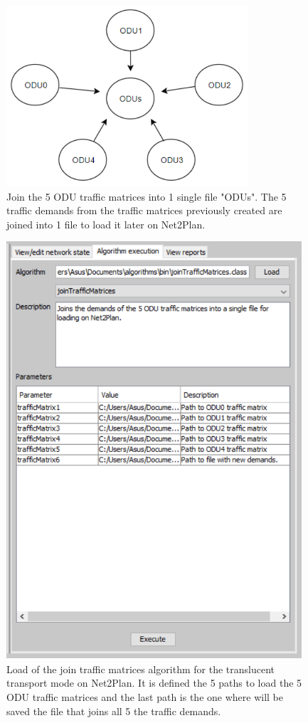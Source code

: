 \begin{figure}[H]
\centering
\includegraphics[width=9cm]{sdf/heuristic/translucent_survivability/figures/join_matrices_odus}
\caption{Join the 5 ODU traffic matrices into 1 single file "ODUs". The 5 traffic demands from the traffic matrices previously created are joined into 1 file to load it later on Net2Plan.}
\label{join_matrices_odus}
\end{figure}

\begin{figure}[H]
\centering
\includegraphics[width=11cm]{sdf/heuristic/translucent_survivability/figures/traffic_matrices}
\caption{Load of the join traffic matrices algorithm for the translucent transport mode on Net2Plan. It is defined the 5 paths to load the 5 ODU traffic matrices and the last path is the one where will be saved the file that joins all 5 the traffic demands.}
\label{traffic_matrices_transl_surv_ref}
\end{figure}

